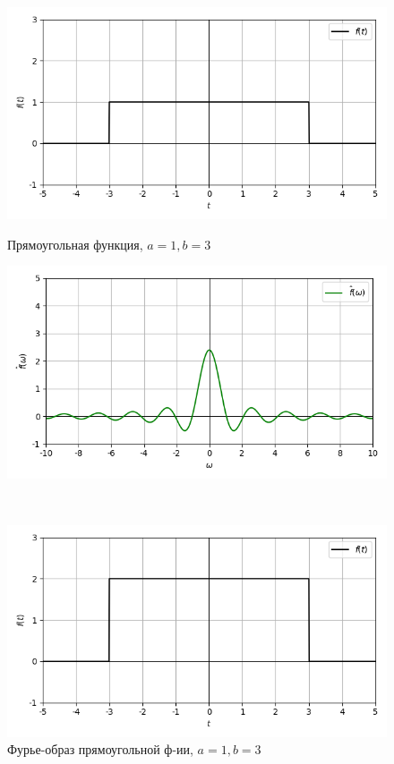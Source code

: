 \documentclass[a4paper]{article}
\begin{document}
\begin{figure}[H]
        \begin{minipage}{0.5\textwidth}
        \centering \includegraphics[width=\textwidth]{rectangular/real_graph_1_3.png}
        \caption{Прямоугольная функция, $a = 1, b = 3$}
    \end{minipage}\hfill
    \begin{minipage}{0.5\textwidth}
        \centering \includegraphics[width=\textwidth]{rectangular/real_fourier_1_3.png}
        \caption{Фурье-образ прямоугольной ф-ии, $a = 1, b = 3$}
    \end{minipage}\\[1em]
        \begin{minipage}{0.5\textwidth}
        \centering \includegraphics[width=\textwidth]{rectangular/real_graph_2_3.png}

\end{minipage}
\end{figure}
\end{document}
